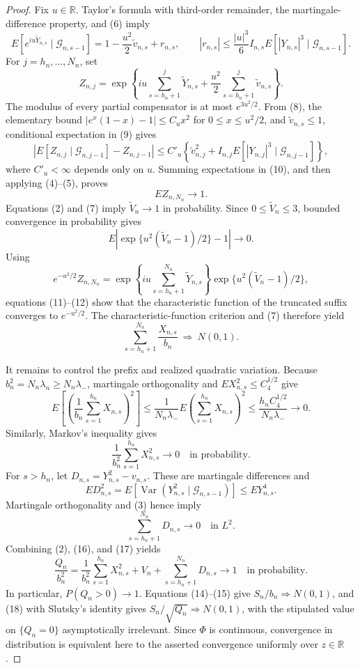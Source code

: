 \documentclass{article}
\begin{document}
\begin{proof}
Fix \(u\in\mathbb R\).  Taylor's formula with third-order remainder, the martingale-difference property, and (6) imply
\[
E[e^{iu\widetilde Y_{n,s}}\mid\mathcal G_{n,s-1}]
=1-\frac{u^2}{2}\widetilde v_{n,s}+r_{n,s},
\qquad
|r_{n,s}|\le\frac{|u|^3}{6}I_{n,s}
E[|Y_{n,s}|^3\mid\mathcal G_{n,s-1}].
\tag{8}
\]
For \(j=h_n,\ldots,N_n\), set
\[
Z_{n,j}=\exp\!\left\{iu\sum_{s=h_n+1}^{j}\widetilde Y_{n,s}
+\frac{u^2}{2}\sum_{s=h_n+1}^{j}\widetilde v_{n,s}\right\}.
\tag{9}
\]
The modulus of every partial compensator is at most \(e^{3u^2/2}\).  From (8), the elementary bound
\( |e^x(1-x)-1|\le C_u x^2 \) for \(0\le x\le u^2/2\), and \(\widetilde v_{n,s}\le1\), conditional expectation in (9) gives
\[
\left|E[Z_{n,j}\mid\mathcal G_{n,j-1}]-Z_{n,j-1}\right|
\le C'_u\left\{\widetilde v_{n,j}^2+
I_{n,j}E[|Y_{n,j}|^3\mid\mathcal G_{n,j-1}]\right\},
\tag{10}
\]
where \(C'_u<\infty\) depends only on \(u\).  Summing expectations in (10), and then applying (4)--(5), proves
\[
E Z_{n,N_n}\longrightarrow1.
\tag{11}
\]
Equations (2) and (7) imply \(\widetilde V_n\to1\) in probability.  Since \(0\le\widetilde V_n\le3\), bounded convergence in probability gives
\[
E\left|\exp\{u^2(\widetilde V_n-1)/2\}-1\right|\longrightarrow0.
\tag{12}
\]
Using
\[
e^{-u^2/2}Z_{n,N_n}
=\exp\!\left\{iu\sum_{s=h_n+1}^{N_n}\widetilde Y_{n,s}\right\}
\exp\{u^2(\widetilde V_n-1)/2\},
\tag{13}
\]
equations (11)--(12) show that the characteristic function of the truncated suffix converges to \(e^{-u^2/2}\).  The characteristic-function criterion and (7) therefore yield
\[
\sum_{s=h_n+1}^{N_n}\frac{X_{n,s}}{b_n}\ \Rightarrow\ N(0,1).
\tag{14}
\]

It remains to control the prefix and realized quadratic variation.  Because \(b_n^2=N_n\lambda_n\ge N_n\lambda_-\), martingale orthogonality and \(E X_{n,s}^2\le C_4^{1/2}\) give
\[
E\left[\left(\frac1{b_n}\sum_{s=1}^{h_n}X_{n,s}\right)^2\right]
\le\frac{1}{N_n\lambda_-}E\left(\sum_{s=1}^{h_n}X_{n,s}\right)^2
\le\frac{h_nC_4^{1/2}}{N_n\lambda_-}\longrightarrow0.
\tag{15}
\]
Similarly, Markov's inequality gives
\[
\frac1{b_n^2}\sum_{s=1}^{h_n}X_{n,s}^2\longrightarrow0
\quad\text{in probability}.
\tag{16}
\]
For \(s>h_n\), let \(D_{n,s}=Y_{n,s}^2-v_{n,s}\).  These are martingale differences and
\[
E D_{n,s}^2
=E\!\left[\operatorname{Var}(Y_{n,s}^2\mid\mathcal G_{n,s-1})\right]
\le E Y_{n,s}^4.
\]
Martingale orthogonality and (3) hence imply
\[
\sum_{s=h_n+1}^{N_n}D_{n,s}\longrightarrow0
\quad\text{in }L^2.
\tag{17}
\]
Combining (2), (16), and (17) yields
\[
\frac{Q_n}{b_n^2}
=\frac1{b_n^2}\sum_{s=1}^{h_n}X_{n,s}^2+V_n
+\sum_{s=h_n+1}^{N_n}D_{n,s}
\longrightarrow1
\quad\text{in probability}.
\tag{18}
\]
In particular, \(P(Q_n>0)\to1\).  Equations (14)--(15) give \(S_n/b_n\Rightarrow N(0,1)\), and (18) with Slutsky's identity gives \(S_n/\sqrt{Q_n}\Rightarrow N(0,1)\), with the stipulated value on \(\{Q_n=0\}\) asymptotically irrelevant.  Since \(\Phi\) is continuous, convergence in distribution is equivalent here to the asserted convergence uniformly over \(z\in\mathbb R\).


\end{proof}
\end{document}
